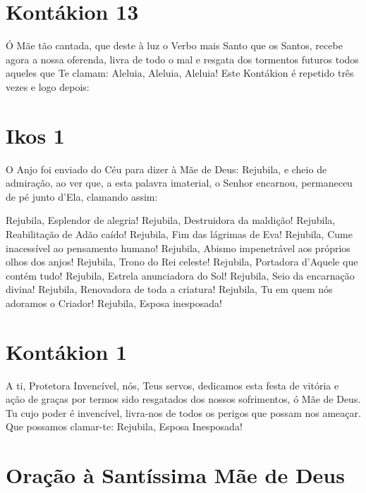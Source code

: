 \documentclass{subfiles}
\begin{document}
\section*{Kontákion 13}

Ó Mãe tão cantada, que deste à luz o Verbo mais Santo que os Santos,
recebe agora a nossa oferenda, livra de todo o mal e resgata dos tormentos
futuros todos aqueles que Te clamam: Aleluia, Aleluia, Aleluia! Este Kontákion
é repetido três vezes e logo depois:

\section*{Ikos 1}

O Anjo foi enviado do Céu para dizer à Mãe de Deus: Rejubila, e cheio
de admiração, ao ver que, a esta palavra imaterial, o Senhor encarnou,
permaneceu de pé junto d'Ela, clamando assim:

Rejubila, Esplendor de alegria!
Rejubila, Destruidora da maldição!
Rejubila, Reabilitação de Adão caído!
Rejubila, Fim das lágrimas de Eva!
Rejubila, Cume inacessível ao pensamento humano!
Rejubila, Abismo impenetrável aos próprios olhos dos anjos!
Rejubila, Trono do Rei celeste!
Rejubila, Portadora d'Aquele que contém tudo!
Rejubila, Estrela anunciadora do Sol!
Rejubila, Seio da encarnação divina!
Rejubila, Renovadora de toda a criatura!
Rejubila, Tu em quem nós adoramos o Criador!
Rejubila, Esposa inesposada!

\section*{Kontákion 1}

A ti, Protetora Invencível, nós, Teus servos, dedicamos esta festa de
vitória e ação de graças por termos sido resgatados dos nossos sofrimentos, ó
Mãe de Deus. Tu cujo poder é invencível, livra-nos de todos os perigos que
possam nos ameaçar. Que possamos clamar-te: Rejubila, Esposa Inesposada!

\section*{Oração à Santíssima Mãe de Deus}
\end{document}
